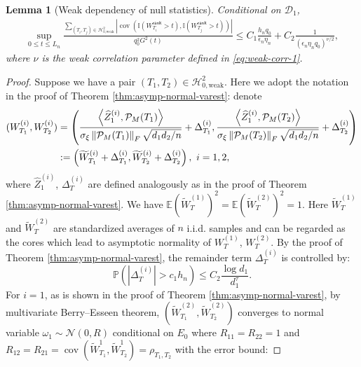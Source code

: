 \documentclass[12pt]{article}
\newcommand{\tF}{{\rm F}}
\newcommand{\abs}[1]{\left\lvert#1\right\rvert}
\newcommand{\norm}[1]{\left\lVert#1\right\rVert}
\newcommand{\PP}{\mathbb{P}}
\newcommand{\E}{\mathbb{E}}
\newcommand{\cH}{\mathcal{H}}
\newcommand{\cP}{\mathcal{P}}
\newcommand{\cD}{\mathcal{D}}
\newcommand{\cN}{\mathcal{N}}
\newcommand{\bbI}{\mathbb{I}}
\def\PP{{\mathbb P}}
\newtheorem{Lemma}{Lemma}
\theoremstyle{plain}
\begin{document}
\begin{Lemma}[Weak dependency of null statistics]\label{lemma:weak-cov}
        Conditional on $\cD_1$, 
\begin{equation}
\begin{aligned}
          \sup_{0\le t\le L_n } \frac{\sum_{(T_i,T_j)\in \cH_{0,\text{weak} }^2 } \abs{\operatorname{cov}(\bbI(W_{T_i}^{\mathsf{rank} }>t),\bbI(W_{T_j}^{\mathsf{rank} }>t)) }}{ q_0^2 G^2(t)}\le  C_1 \frac{h_n q_0}{\epsilon_n \eta_n }+C_2 \frac{1}{ \left(\epsilon_n\eta_n q_0\right)^{\nu/2} },
\end{aligned}
\end{equation}
where $\nu$ is the weak correlation parameter defined in \eqref{eq:weak-corr-1}.
\end{Lemma}
\begin{proof}
Suppose we have a pair $(T_1,T_2)\in \cH_{0,\text{weak} }^2$. Here we adopt the notation in the proof of Theorem \ref{thm:asymp-normal-varest}: denote 
$$
\begin{aligned}
     (W_{T_1}^{(i)},W_{T_2}^{(i)}) &= \left(\frac{\left\langle  \widehat{Z}_1^{(i)} , \cP_M(T_1) \right\rangle }{\sigma_{\xi} \norm{\cP_M(T_1) }_\tF  \sqrt{d_1 d_2/n}}+ \Delta_{T_1}^{(i)}, \frac{\left\langle  \widehat{Z}_1^{(i)} , \cP_M(T_2) \right\rangle }{\sigma_{\xi} \norm{\cP_M(T_2) }_\tF  \sqrt{d_1 d_2/n}}+ \Delta_{T_2}^{(i)} \right) \\
     &:= \left(\widetilde{W}^{(i)}_{T_1}+\Delta_{T_1}^{(i)}  , \widetilde{W}^{(i)}_{T_2}+\Delta_{T_2}^{(i)} \right),\ i=1,2,
\end{aligned}
$$
where $\widehat{Z}_1^{(i)} $, $\Delta^{(i)}_T$ are defined analogously as in the proof of Theorem \ref{thm:asymp-normal-varest}. We have $\E (\widetilde{W}^{(1)}_T)^2=\E (\widetilde{W}^{(2)}_T)^2=1 $. Here $\widetilde{W}^{(1)}_T$ and $\widetilde{W}^{(2)}_T$ are standardized averages of $n$ i.i.d. samples and can be regarded as the cores which lead to asymptotic normality of $W^{(1)}_T$, $W^{(2)}_T$. By the proof of Theorem \ref{thm:asymp-normal-varest}, the remainder term $ \Delta^{(i)}_T$ is controlled by:
\begin{equation}\label{eq:remainder}
    \PP\left(\abs{\Delta^{(i)}_T}>c_1 h_n \right)\le C_2 \frac{\log d_1}{d_1^\tau}.
\end{equation}
For $i=1$, as is shown in the proof of Theorem \ref{thm:asymp-normal-varest},  by multivariate Berry--Esseen theorem,   $(\widetilde{W}^{(2)}_{T_1},\widetilde{W}^{(2)}_{T_2})$  converges to normal variable $\omega_1 \sim \cN(0,R)$ conditional on $E_0$ where $R_{11}=R_{22}=1$ and $R_{12}=R_{21}=\operatorname{cov}(\widetilde{W}^1_{T_1},\widetilde{W}^1_{T_2})=\rho_{T_1,T_2}$ with the error bound:


\end{proof}
\end{document}
